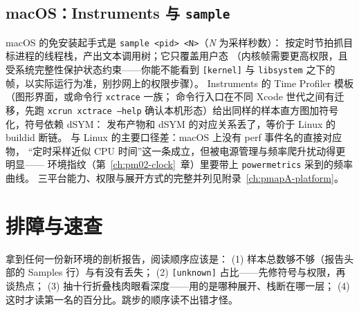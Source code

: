 \documentclass[12pt,a4paper,fontset=fandol]{ctexbook}
\newcommand{\Tp}[1]{\texttt{#1}}
\begin{document}
\subsection{macOS：Instruments 与 \Tp{sample}}

macOS 的免安装起手式是 \Tp{sample <pid> <N>}（\emph{N} 为采样秒数）：
按定时节拍抓目标进程的线程栈，产出文本调用树；它只覆盖用户态
（内核帧需要更高权限，且受系统完整性保护状态约束——你能不能看到
\Tp{[kernel]} 与 \Tp{libsystem} 之下的帧，以实际运行为准，别抄网上的权限步骤）。
Instruments 的 Time Profiler 模板（图形界面，或命令行 \Tp{xctrace} 一族；
命令行入口在不同 Xcode 世代之间有迁移，先跑 \Tp{xcrun xctrace --help}
确认本机形态）给出同样的样本直方图加符号化，符号依赖 dSYM：
发布产物和 dSYM 的对应关系丢了，等价于 Linux 的 buildid 断链。
与 Linux 的主要口径差：macOS 上没有 perf 事件名的直接对应物，
``定时采样近似 CPU 时间''这一条成立，但被电源管理与频率爬升扰动得更明显——
环境指纹（第~\ref{ch:pm02-clock}~章）里要带上 \Tp{powermetrics} 采到的频率曲线。
三平台能力、权限与展开方式的完整并列见附录~\ref{ch:pmapA-platform}。

\section{排障与速查}
\label{sec:pm04-trouble}

\begin{guideline}[title={第一次剖析：先问栈，再问热点}]
拿到任何一份新环境的剖析报告，阅读顺序应该是：
(1) 样本总数够不够（报告头部的 Samples 行）与有没有丢失；
(2) \Tp{[unknown]} 占比——先修符号与权限，再谈热点；
(3) 抽十行折叠栈肉眼看深度——用的是哪种展开、栈断在哪一层；
(4) 这时才读第一名的百分比。跳步的顺序读不出错才怪。
\end{guideline}
\end{document}
